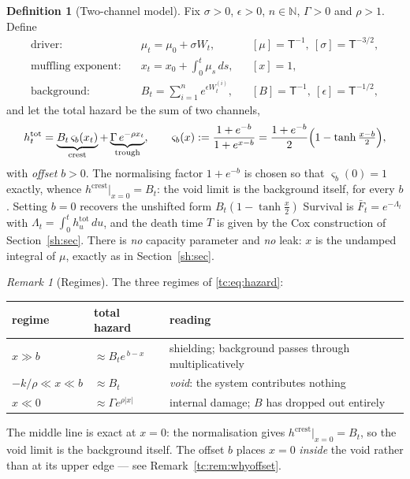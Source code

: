 \documentclass[11pt]{article}
\numberwithin{equation}{section}
\theoremstyle{plain}
\theoremstyle{definition}
\newtheorem{definition}[theorem]{Definition}
\theoremstyle{remark}
\newtheorem{remark}[theorem]{Remark}
\begin{document}
\begin{definition}[Two-channel model]\label{tc:def:model}
Fix $\sigma>0$, $\epsilon>0$, $n\in\mathbb N$, $\Gamma>0$ and
$\rho>1$. Define
\begin{align}
\text{driver:}&\quad \mu_t=\mu_0+\sigma W_t,
&&[\mu]=\mathsf T^{-1},\ [\sigma]=\mathsf T^{-3/2},
\label{tc:eq:driver}\\
\text{muffling exponent:}&\quad x_t=x_0+\int_0^t\mu_s\,ds,
&&[x]=1,
\label{tc:eq:x}\\
\text{background:}&\quad B_t=\sum_{i=1}^{n}e^{\epsilon W^{(i)}_t},
&&[B]=\mathsf T^{-1},\ [\epsilon]=\mathsf T^{-1/2},
\label{tc:eq:B}
\end{align}
and let the total hazard be the sum of two channels,
\begin{equation}\label{tc:eq:hazard}
h^{\mathrm{tot}}_t
=\underbrace{B_t\,\varsigma_b(x_t)}_{\text{crest}}
+\underbrace{\Gamma\,e^{-\rho x_t}}_{\text{trough}},
\qquad
\varsigma_b(x):=\frac{1+e^{-b}}{1+e^{x-b}}
=\frac{1+e^{-b}}{2}\Bigl(1-\tanh\tfrac{x-b}{2}\Bigr),
\end{equation}
with \emph{offset} $b>0$. The normalising factor $1+e^{-b}$ is chosen so
that $\varsigma_b(0)=1$ exactly, whence $h^{\mathrm{crest}}|_{x=0}=B_t$:
the void limit is the background itself, for every $b$. Setting $b=0$
recovers the unshifted form $B_t(1-\tanh\frac{x}{2})$
Survival is $\bar F_t=e^{-\Lambda_t}$ with
$\Lambda_t=\int_0^t h^{\mathrm{tot}}_u\,du$, and the death time $T$ is
given by the Cox construction of Section~\ref{sh:sec}. There is \emph{no}
capacity parameter and \emph{no} leak: $x$ is the undamped integral of
$\mu$, exactly as in Section~\ref{sh:sec}.
\end{definition}

\begin{remark}[Regimes]\label{tc:rem:regimes}
The three regimes of \eqref{tc:eq:hazard}:
\begin{center}\small
\begin{tabular}{@{}lll@{}}
\toprule
regime & total hazard & reading\\
\midrule
$x\gg b$ & $\approx B_te^{\,b-x}$ & shielding; background passes through
multiplicatively\\
$-k/\rho\ll x\ll b$ & $\approx B_t$ & \emph{void}: the system
contributes nothing\\
$x\ll0$ & $\approx\Gamma e^{\rho|x|}$ & internal damage; $B$ has dropped
out entirely\\
\bottomrule
\end{tabular}
\end{center}
The middle line is exact at $x=0$: the normalisation gives
$h^{\mathrm{crest}}|_{x=0}=B_t$, so the void limit is the background
itself. The offset $b$ places $x=0$ \emph{inside} the void rather than
at its upper edge --- see Remark~\ref{tc:rem:whyoffset}.
\end{remark}
\end{document}
